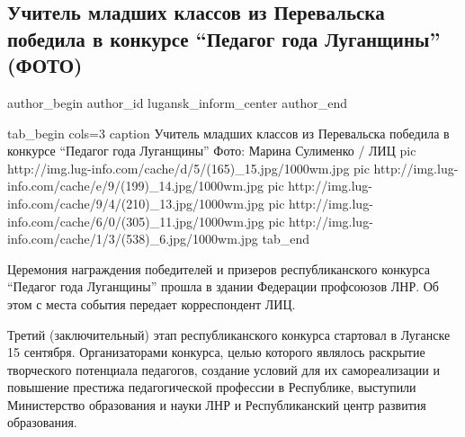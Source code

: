  
 
 
 
 
 
\subsection{Учитель младших классов из Перевальска победила в конкурсе \enquote{Педагог года Луганщины} (ФОТО)}
\label{sec:05_10_2020.news.lnr.lug_info.lugansk_inform_center.1.uchitel_mladshih_klassov}
\ifcmt
	author_begin
   author_id lugansk_inform_center
	author_end
\fi


\ifcmt
tab_begin cols=3
	caption Учитель младших классов из Перевальска победила в конкурсе \enquote{Педагог года Луганщины} Фото: Марина Сулименко / ЛИЦ
pic http://img.lug-info.com/cache/d/5/(165)_15.jpg/1000wm.jpg
pic http://img.lug-info.com/cache/e/9/(199)_14.jpg/1000wm.jpg
pic http://img.lug-info.com/cache/9/4/(210)_13.jpg/1000wm.jpg
pic http://img.lug-info.com/cache/6/0/(305)_11.jpg/1000wm.jpg
pic http://img.lug-info.com/cache/1/3/(538)_6.jpg/1000wm.jpg
tab_end
\fi

Церемония награждения победителей и призеров республиканского конкурса \enquote{Педагог
года Луганщины} прошла в здании Федерации профсоюзов ЛНР. Об этом с места
события передает корреспондент ЛИЦ.

Третий (заключительный) этап республиканского конкурса стартовал в Луганске 15
сентября. Организаторами конкурса, целью которого являлось раскрытие
творческого потенциала педагогов, создание условий для их самореализации и
повышение престижа педагогической профессии в Республике, выступили
Министерство образования и науки ЛНР и Республиканский центр развития
образования.

